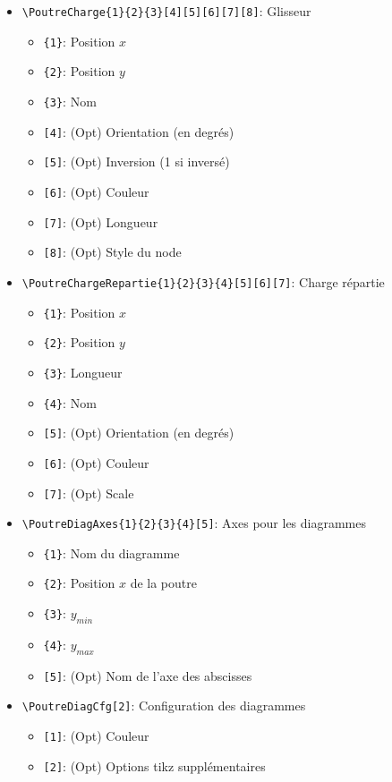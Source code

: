 \documentclass[11pt]{ltxdockit}[2010/09/26]
\begin{document}
\begin{itemize}
\vspace{1em}
\item \verb!\PoutreCharge{1}{2}{3}[4][5][6][7][8]!: Glisseur
\begin{itemize}
\item \verb!{1}!: Position $x$
\item \verb!{2}!: Position $y$
\item \verb!{3}!: Nom
\item \verb![4]!: (Opt) Orientation (en degrés) 
\item \verb![5]!: (Opt) Inversion (1 si inversé)
\item \verb![6]!: (Opt) Couleur
\item \verb![7]!: (Opt) Longueur
\item \verb![8]!: (Opt) Style du node
\end{itemize}

\vspace{1em}
\item \verb!\PoutreChargeRepartie{1}{2}{3}{4}[5][6][7]!: Charge répartie
\begin{itemize}
\item \verb!{1}!: Position $x$
\item \verb!{2}!: Position $y$
\item \verb!{3}!: Longueur
\item \verb!{4}!: Nom
\item \verb![5]!: (Opt) Orientation (en degrés)
\item \verb![6]!: (Opt) Couleur
\item \verb![7]!: (Opt) Scale
\end{itemize}

\vspace{1em}
\item \verb!\PoutreDiagAxes{1}{2}{3}{4}[5]!: Axes pour les diagrammes
\begin{itemize}
\item \verb!{1}!: Nom du diagramme
\item \verb!{2}!: Position $x$ de la poutre
\item \verb!{3}!: $y_{min}$
\item \verb!{4}!: $y_{max}$
\item \verb![5]!: (Opt) Nom de l'axe des abscisses
\end{itemize}

\vspace{1em}
\item \verb!\PoutreDiagCfg[2]!: Configuration des diagrammes
\begin{itemize}
\item \verb![1]!: (Opt) Couleur
\item \verb![2]!: (Opt) Options tikz supplémentaires
\end{itemize}

\end{itemize}
\end{document}
